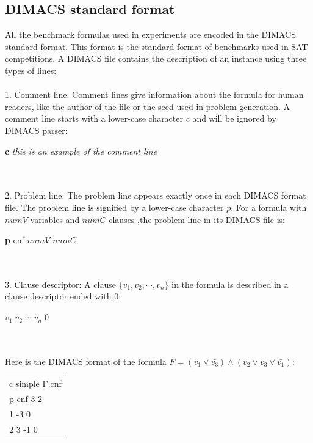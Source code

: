 \documentclass[12pt,a4paper,twoside]{scrartcl}
\numberwithin{equation}{section}
\begin{document}
\subsection{DIMACS standard format}  
All the benchmark formulas used in experiments are encoded in the DIMACS standard format\cite{balyo2017proceedings}. This format is the standard format of benchmarks used in SAT competitions. A DIMACS file contains the description of an instance using three types of lines:\\
\\ 1. Comment line: Comment lines give information about the formula for human readers, like the author of the file or the seed used in problem generation. A comment line starts with a lower-case character $c$ and will be ignored by DIMACS parser:\\ \centerline{\textbf{c} \emph{ this is an example of the comment line }}\\ \\ 2. Problem line: The problem line appears exactly once in each DIMACS format file. The problem line is signified by a lower-case character $p$.  For a formula with $numV$ variables and $numC$ clauses ,the problem line in its DIMACS file is:\\ \centerline{\textbf{p} cnf $numV$ $numC$}\\ \\ 3. Clause descriptor: A clause $\{v_1, v_2,\cdots, v_n\}$ in the formula is described in a clause descriptor ended with $0$:\\ \centerline{ $v_1\; v_2\;\cdots  \;v_n\;0$}\\  
\\
Here is the DIMACS format of the formula $F = (v_1 \lor \bar{v_3}) \land (v_2 \lor v_3 \lor \bar{v_1})$:
\begin{center}
\begin{tabular}{l}
c simple F.cnf\\
p cnf 3 2\\
1 -3 0\\
2 3 -1 0 \\
\end{tabular}
\end{center}
\end{document}
